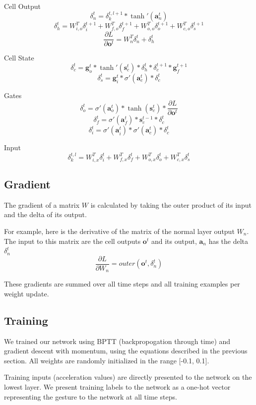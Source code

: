 \documentclass[11pt]{article}
\begin{document}
Cell Output
\[  \delta_{n}^{t} = \delta_{k}^{t,l+1}*\tanh'({\textbf{a}_{n}^{t}}) \]
\[ \delta_{h}^{t} = W_{i,o}^{T}\delta_{i}^{t+1} +  W_{f,o}^{T}\delta_{f}^{t+1} +  W_{o,o}^{T}\delta_{o}^{t+1} +  W_{c,o}^{T}\delta_{s}^{t+1} \]
\[ \frac{\partial L}{\partial \textbf{o}^{t}} = W_{n}^{T} \delta_{n}^{t} +  \delta_{h}^{t} \]

Cell State
\[ \delta_{c}^{t} = \textbf{g}_{o}^{t} * \tanh'({\textbf{s}_{c}^{t}}) * \delta_{h}^{t} * \delta_{c}^{t+1} * \textbf{g}_{f}^{t+1} \]
\[ \delta_{s}^{t} = \textbf{g}_{i}^{t} * \sigma'(\textbf{a}_{c}^{t}) * \delta_{c}^{t} \]

Gates
\[ \delta_{o}^{t} = \sigma'(\textbf{a}_{o}^{t}) * \tanh( \textbf{s}_{c}^{t}) * \frac{\partial L}{\partial \textbf{o}^{t}} \]
\[ \delta_{f}^{t} = \sigma'(\textbf{a}_{f}^{t}) * \textbf{s}_{c}^{t-1} * \delta_{c}^{t} \]
\[ \delta_{i}^{t} = \sigma'(\textbf{a}_{i}^{t}) * \sigma'( \textbf{a}_{c}^{t}) * \delta_{c}^{t} \]

Input
\[  \delta_{k}^{t,l} = W_{i,x}^{T}\delta_{i}^{t} +  W_{f,x}^{T}\delta_{f}^{t} +  W_{o,x}^{T}\delta_{o}^{t} +  W_{c,x}^{T}\delta_{s}^{t} \]

\subsection{Gradient}

The gradient of a matrix \(W\) is calculated by
taking the outer product of its input and the delta
of its output.

For example, here is the derivative of the matrix of
the normal layer output \(W_{n}\). The input to
this matrix are the cell outputs \(\textbf{o}^{t}\) and
its output, \(\textbf{a}_{n}\) has the delta \(\delta_{n}^{t}\)
\[ \frac{\partial L}{\partial W_{n}} = outer(\textbf{o}^{t}, \delta_{n}^{t} ) \]

These gradients are summed over all time steps and
all training examples per weight update.

\subsection{Training}

We trained our network using BPTT (backpropogation through time) and
gradient descent with momentum, using the equations described in
the previous section. All weights are randomly initialized
in the range [-0.1, 0.1].

Training inputs (acceleration values) are directly presented to
the network on the lowest layer. We present training labels 
to the network as a one-hot vector representing the
gesture to the network at all time steps.
\end{document}
